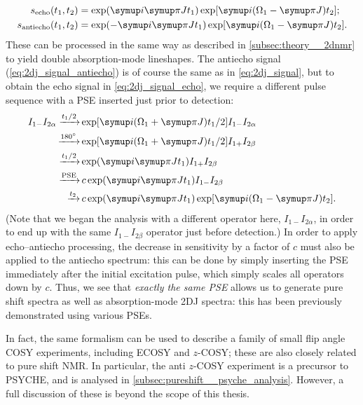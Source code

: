 \begin{align}
    s_\text{echo}(t_1, t_2) &= \exp(\mi\cpi Jt_1) \exp[\mi(\Omega_1 - \cpi J) t_2]; \label{eq:2dj_signal_echo} \\
    s_\text{antiecho}(t_1, t_2) &= \exp(-\mi\cpi Jt_1) \exp[\mi(\Omega_1 - \cpi J)t_2]. \label{eq:2dj_signal_antiecho}
\end{align}
These can be processed in the same way as described in \cref{subsec:theory__2dnmr} to yield double absorption-mode lineshapes.
The antiecho signal (\cref{eq:2dj_signal_antiecho}) is of course the same as in \cref{eq:2dj_signal}, but to obtain the echo signal in \cref{eq:2dj_signal_echo}, we require a different pulse sequence with a PSE inserted just prior to detection:
\begin{align}
    \label{eq:2dj_signal_echo_ctp}
    I_{1-}I_{2\alpha} \xrightarrow[]{t_1/2} &\exp[\mi(\Omega_1 + \cpi J)t_1/2] I_{1-}I_{2\alpha} \\
    \xrightarrow[]{\ang{180}} &\exp[\mi(\Omega_1 + \cpi J)t_1/2] I_{1+}I_{2\beta} \\
    \xrightarrow[]{t_1/2} &\exp(\mi\cpi Jt_1) I_{1+}I_{2\beta} \\
    \xrightarrow[]{\text{PSE}} &\,c \exp(\mi\cpi Jt_1) I_{1-}I_{2\beta} \\
    \xrightarrow[]{t_2} &\,c \exp(\mi\cpi Jt_1) \exp[\mi(\Omega_1 - \cpi J)t_2].
\end{align}
(Note that we began the analysis with a different operator here, $I_{1-}I_{2\alpha}$, in order to end up with the same $I_{1-}I_{2\beta}$ operator just before detection.)
In order to apply echo--antiecho processing, the decrease in sensitivity by a factor of $c$ must also be applied to the antiecho spectrum: this can be done by simply inserting the PSE immediately after the initial excitation pulse, which simply scales all operators down by $c$.
Thus, we see that \textit{exactly the same PSE} allows us to generate pure shift spectra as well as absorption-mode 2DJ spectra: this has been previously demonstrated using various PSEs.\autocite{Pell2007JMR,Foroozandeh2015CC}

In fact, the same formalism can be used to describe a family of small flip angle COSY experiments, including ECOSY\autocite{Griesinger1985JACS,Sorensen1985JACS,Griesinger1986JCP} and $z$-COSY\autocite{Oschkinat1986JMR,Pell2007MRC,Moutzouri2020ACIE}; these are also closely related to pure shift NMR.
In particular, the anti $z$-COSY experiment is a precursor to PSYCHE, and is analysed in \cref{subsec:pureshift__psyche_analysis}.
However, a full discussion of these is beyond the scope of this thesis.
